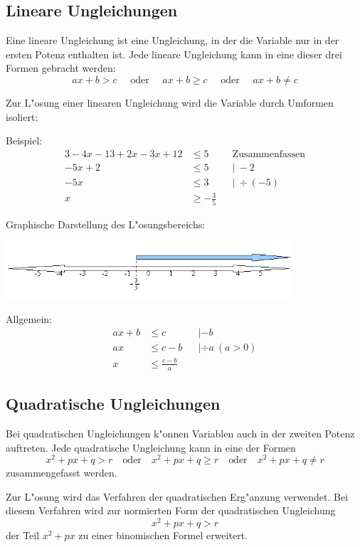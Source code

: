 \subsection{Lineare Ungleichungen}
Eine lineare Ungleichung ist eine Ungleichung, in der die Variable nur in der ersten Potenz enthalten ist. Jede lineare Ungleichung kann in eine dieser drei Formen gebracht werden:
\[ax + b > c\quad \text{ oder }\quad
ax + b \geq c\quad \text{ oder }\quad
ax + b \neq c \]


\noindent Zur L"osung einer linearen Ungleichung wird die Variable durch Umformen isoliert:

Beispiel:
\begin{align*}
3 - 4x - 13 + 2x - 3x + 12 &\leq 5 && \text{Zusammenfassen}\\
-5 x + 2 & \leq 5 && |\ -2 \\
-5x &\leq 3 &&|\ \div (-5) \\
 x &\geq - \frac{3}{5}
\end{align*}

Graphische Darstellung des L"osungsbereichs:
\begin{center}
\includegraphics[width=0.8\textwidth]{img/ungleichungen/LBer1.png}
\end{center}

Allgemein:
\begin{align*}
ax + b &\leq c &&| -b\\
ax &\leq c - b &&|\div a ~(a > 0) \\
x &\leq \frac {c - b} a
\end{align*}


\subsection{Quadratische Ungleichungen}

Bei quadratischen Ungleichungen k"onnen Variablen auch in der zweiten Potenz
auftreten. Jede quadratische Ungleichung kann in eine der Formen 
\[x^2 + px + q > r 
\quad \text{oder} \quad
x^2 + px + q \geq r 
\quad \text{oder} \quad
x^2 + px + q \neq r \]
zusammengefasst werden.

\noindent Zur L"osung wird das Verfahren der quadratischen Erg"anzung verwendet.
Bei diesem Verfahren wird zur normierten Form der quadratischen Ungleichung 
\[x^2 + px + q > r\] der Teil $x^2 + px$ zu einer binomischen Formel erweitert.

